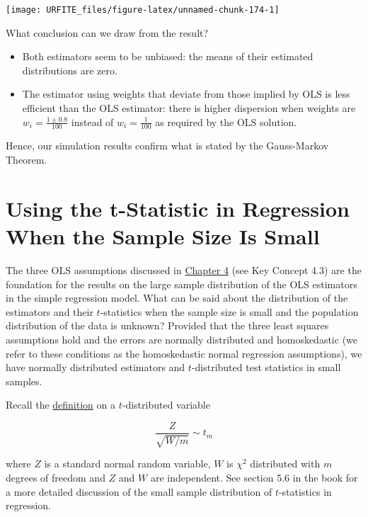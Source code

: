 \documentclass[]{book}
\providecommand{\tightlist}{%
  \setlength{\itemsep}{0pt}\setlength{\parskip}{0pt}}
\theoremstyle{definition}
\theoremstyle{definition}
\theoremstyle{definition}
\theoremstyle{remark}
\begin{document}
\begin{center}\texttt{[image: URFITE\_files/figure-latex/unnamed-chunk-174-1]} \end{center}

What conclusion can we draw from the result?

\begin{itemize}
\tightlist
\item
  Both estimators seem to be unbiased: the means of their estimated
  distributions are zero.
\item
  The estimator using weights that deviate from those implied by OLS is
  less efficient than the OLS estimator: there is higher dispersion when
  weights are \(w_i = \frac{1 \pm 0.8}{100}\) instead of
  \(w_i=\frac{1}{100}\) as required by the OLS solution.
\end{itemize}

Hence, our simulation results confirm what is stated by the Gauss-Markov
Theorem.

\section{Using the t-Statistic in Regression When the Sample Size Is
Small}\label{using-the-t-statistic-in-regression-when-the-sample-size-is-small}

The three OLS assumptions discussed in \protect\hyperlink{lrwor}{Chapter
4} (see Key Concept 4.3) are the foundation for the results on the large
sample distribution of the OLS estimators in the simple regression
model. What can be said about the distribution of the estimators and
their \(t\)-statistics when the sample size is small and the population
distribution of the data is unknown? Provided that the three least
squares assumptions hold and the errors are normally distributed and
homoskedastic (we refer to these conditions as the homoskedastic normal
regression assumptions), we have normally distributed estimators and
\(t\)-distributed test statistics in small samples.

Recall the \protect\hyperlink{thetdist}{definition} on a
\(t\)-distributed variable

\[ \frac{Z}{\sqrt{W/m}} \sim t_m\]

where \(Z\) is a standard normal random variable, \(W\) is \(\chi^2\)
distributed with \(m\) degrees of freedom and \(Z\) and \(W\) are
independent. See section 5.6 in the book for a more detailed discussion
of the small sample distribution of \(t\)-statistics in regression.
\end{document}
